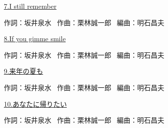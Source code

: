 \small{\hyperlink{5_6}{7.I still remember}}

\tiny{作詞：坂井泉水 \ 作曲：栗林誠一郎 \ 編曲：明石昌夫}

\small{\hyperlink{5_7}{8.If you gimme smile}}

\tiny{作詞：坂井泉水 \ 作曲：栗林誠一郎 \ 編曲：明石昌夫}

\small{\hyperlink{5_8}{9.来年の夏も}}

\tiny{作詞：坂井泉水 \ 作曲：栗林誠一郎 \ 編曲：明石昌夫}

\small{\hyperlink{5_9}{10.あなたに帰りたい}}

\tiny{作詞：坂井泉水 \ 作曲：栗林誠一郎 \ 編曲：明石昌夫}

\small{ \ }

\tiny{ \ }

\small{ \ }

\tiny{ \ }

\small{ \ }

\tiny{ \ }

\clearpage
